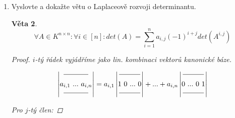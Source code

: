 \documentclass[10pt,a4paper]{article}
\theoremstyle{plain}
\newtheorem{veta}{Věta}
\begin{document}
\begin{enumerate}
\begin{veta}
\begin{proof}
\begin{enumerate}[label=(\alph*)]
Z těchto dvou lze odvodit zbylé dvě operace.

\hfill

Rozložíme regulární A na elementární matice $A = E_1E_2 ... E_k$:

\begin{align*}
det(AB) &= det(E_1E_2 ... E_kB) = det(E_1)det(E_2 ... E_kB) = ... = \\
&=  det(E_1)det(E_2) ... det(E_k)det(B) = det(E_1)det(E_2) ... det(E_{k-1}E_k)det(B) = ... = \\
&= det(E_1E_2 ... E_k)det(B) \\
&= det(A)det(B)
\end{align*}

\end{enumerate}
\end{proof}
\end{veta}

\item Vyslovte a dokažte větu o Laplaceově rozvoji determinantu.

\begin{veta}
\[ \forall A \in K^{n \times n}: \forall i \in [n]: det(A) = \sum_{i=1}^n a_{i,j}(-1)^{i+j}det(A^{i,j})\]
\begin{proof}
$i$-tý řádek vyjádříme jako lin. kombinaci vektorů kanonické báze.

\[ \begin{vmatrix}
\rule[1ex]{3.5em}{0.4pt}\\
a_{i,1}\  ...\  a_{i,n} \\
\rule[.5ex]{3.5em}{0.4pt}
\end{vmatrix} =
a_{i,1}\begin{vmatrix}
\rule[1ex]{3em}{0.4pt}\\
1\ 0\ ...\ 0 \\
\rule[.5ex]{3em}{0.4pt}
\end{vmatrix} + ... + 
a_{i,n}\begin{vmatrix}
\rule[1ex]{3em}{0.4pt}\\
0\ ...\ 0\ 1 \\
\rule[.5ex]{3em}{0.4pt}
\end{vmatrix} \]

Pro $j$-tý člen:


\end{proof}
\end{veta}
\end{enumerate}
\end{document}
